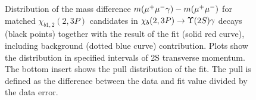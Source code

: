 \begin{figure}[H]
{\begin{picture}





  \end{picture}
  }
  \caption {\small 
    Distribution of the mass difference $m(\mumu\gamma) - m(\mumu)$ for matched
    $\chi_{b1,2}(2,3P)$ candidates in $\chi_b(2,3P) \to \Y2S \gamma$ decays
    (black points) together with the result of the fit (solid red curve),
    including background (dotted blue curve) contribution. Plots show the
    distribution in specified intervals of \Y2S transverse momentum. The bottom
    insert shows the  pull distribution of the fit. The pull is defined as the
    difference  between the data and fit value divided by the data error. }
  \label{fig:mc:ups2s:fits}
\end{figure}

